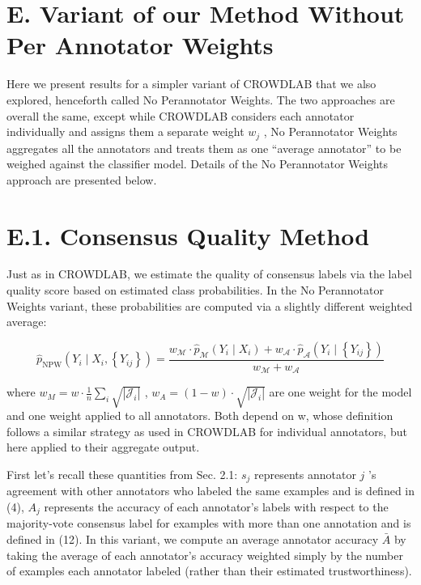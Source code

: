 \documentclass[
]{article}
\begin{document}
\section{E. Variant of our Method Without Per Annotator
Weights}\label{e.-variant-of-our-method-without-per-annotator-weights}

Here we present results for a simpler variant of CROWDLAB that we also
explored, henceforth called No Perannotator Weights. The two approaches
are overall the same, except while CROWDLAB considers each annotator
individually and assigns them a separate weight \(w_{j}\) , No
Perannotator Weights aggregates all the annotators and treats them as
one ``average annotator'' to be weighed against the classifier model.
Details of the No Perannotator Weights approach are presented below.

\section{E.1. Consensus Quality
Method}\label{e.1.-consensus-quality-method}

Just as in CROWDLAB, we estimate the quality of consensus labels via the
label quality score based on estimated class probabilities. In the No
Perannotator Weights variant, these probabilities are computed via a
slightly different weighted average:

\[
\hat {p} _ {\mathrm{NPW}} \left(Y _ {i} \mid X _ {i}, \left\{Y _ {i j} \right\}\right) = \frac {w _ {\mathcal {M}} \cdot \hat {p} _ {\mathcal {M}} \left(Y _ {i} \mid X _ {i}\right) + w _ {\mathcal {A}} \cdot \hat {p} _ {\mathcal {A}} \left(Y _ {i} \mid \left\{Y _ {i j} \right\}\right)}{w _ {\mathcal {M}} + w _ {\mathcal {A}}} \tag {20}
\]

where \(w_{M} = w \cdot \frac{1}{n} \sum_{i} \sqrt{|\mathcal{J}_{i}|}\)
, \(w_{A} = (1 - w) \cdot \sqrt{|\mathcal{J}_{i}|}\) are one weight for
the model and one weight applied to all annotators. Both depend on w,
whose definition follows a similar strategy as used in CROWDLAB for
individual annotators, but here applied to their aggregate output.

First let's recall these quantities from Sec. 2.1: \(s_j\) represents
annotator \(j\) 's agreement with other annotators who labeled the same
examples and is defined in (4), \(A_j\) represents the accuracy of each
annotator's labels with respect to the majority-vote consensus label for
examples with more than one annotation and is defined in (12). In this
variant, we compute an average annotator accuracy \(\bar{A}\) by taking
the average of each annotator's accuracy weighted simply by the number
of examples each annotator labeled (rather than their estimated
trustworthiness).
\end{document}
